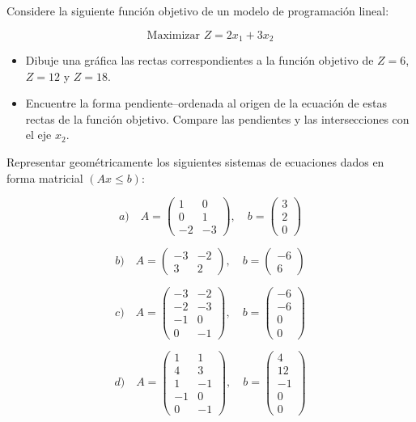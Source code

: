 \begin{Ejer}
Considere la siguiente funci\'on objetivo de un modelo de programaci\'on lineal:

\[
\text{Maximizar } Z = 2x_1 + 3x_2
\]

\begin{itemize}
\item[a)] Dibuje una gr\'afica las rectas correspondientes a la funci\'on objetivo de $Z=6$, $Z=12$ y $Z=18$.
\item[b)] Encuentre la forma pendiente–ordenada al origen de la ecuaci\'on de estas rectas de la funci\'on objetivo. Compare las pendientes y las intersecciones con el eje $x_2$.
\end{itemize}

\begin{Ejer}
Representar geom\'etricamente los siguientes sistemas de ecuaciones dados en forma matricial $(Ax \le b)$:

\[
a)\quad 
A=
\begin{pmatrix}
1 & 0 \\
0 & 1 \\
-2 & -3
\end{pmatrix},
\quad
b=
\begin{pmatrix}
3\\
2\\
0
\end{pmatrix}
\]

\[
b)\quad 
A=
\begin{pmatrix}
-3 & -2\\
3 & 2
\end{pmatrix},
\quad
b=
\begin{pmatrix}
-6\\
6
\end{pmatrix}
\]

\[
c)\quad 
A=
\begin{pmatrix}
-3 & -2\\
-2 & -3\\
-1 & 0\\
0 & -1
\end{pmatrix},
\quad
b=
\begin{pmatrix}
-6\\
-6\\
0\\
0
\end{pmatrix}
\]

\[
d)\quad
A=
\begin{pmatrix}
1 & 1\\
4 & 3\\
1 & -1\\
-1 & 0\\
0 & -1
\end{pmatrix},
\quad
b=
\begin{pmatrix}
4\\
12\\
-1\\
0\\
0
\end{pmatrix}
\]


\end{Ejer}
\end{Ejer}

